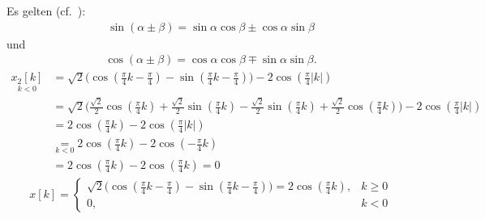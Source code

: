 Es gelten (cf.~\cite{Bronstein2}):
\begin{align}
	\label{eq:SinAlphaPlusMinusBeta}
	\sin(\alpha\pm\beta)=\sin\alpha\cos\beta\pm\cos\alpha\sin\beta
\end{align}
und
\begin{align}
	\label{eq:CosAlphaPlusMinusBeta}
	\cos(\alpha\pm\beta)=\cos\alpha\cos\beta\mp\sin\alpha\sin\beta.
\end{align}
\begin{align}
	\underset{k<0}{x_2[k]}&=\sqrt{2}\bigg(\cos(\frac{\pi}{4}k-\frac{\pi}{4})-\sin(\frac{\pi}{4}k-\frac{\pi}{4})\bigg)-2\cos(\frac{\pi}{4}|k|)\nonumber\\
	&=\sqrt{2}\bigg(\frac{\sqrt{2}}{2}\cos(\frac{\pi}{4}k)+\frac{\sqrt{2}}{2}\sin(\frac{\pi}{4}k)-\frac{\sqrt{2}}{2}\sin(\frac{\pi}{4}k)+\frac{\sqrt{2}}{2}\cos(\frac{\pi}{4}k)\bigg)-2\cos(\frac{\pi}{4}|k|)\nonumber\\
	&=2\cos(\frac{\pi}{4}k)-2\cos(\frac{\pi}{4}|k|)\nonumber \\
	&\underset{k<0}{=}2\cos(\frac{\pi}{4}k)-2\cos(-\frac{\pi}{4}k)\nonumber\\
	&=2\cos(\frac{\pi}{4}k)-2\cos(\frac{\pi}{4}k)=0
\end{align}
\begin{align}
	x[k]=\begin{cases}
		\sqrt{2}\bigg(\cos(\frac{\pi}{4}k-\frac{\pi}{4})-\sin(\frac{\pi}{4}k-\frac{\pi}{4})\bigg)=2\cos(\frac{\pi}{4}k),&k\geq0 \\
		0, &k<0
	\end{cases}
\end{align}
